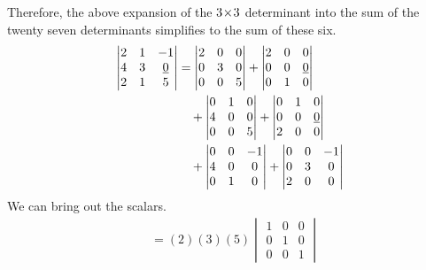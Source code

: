 \begin{example}
Therefore, the above expansion of the \( 3 \! \times \! 3 \) determinant into
the sum of the twenty seven determinants simplifies to the sum of these six.
\begin{align*}
  \begin{vmatrix}
     2  &1  &-1  \\
     4  &3  &\underline{0}  \\
     2  &1  &5
  \end{vmatrix}
  &=\begin{vmatrix}
     2  &0  &0   \\
     0  &3  &0   \\
     0  &0  &5
  \end{vmatrix}
  +
   \begin{vmatrix}
     2  &0  &0   \\
     0  &0  &\underline{0}   \\
     0  &1  &0
  \end{vmatrix}                      \\
  &\quad\hbox{}+\begin{vmatrix}
     0  &1  &0   \\
     4  &0  &0   \\
     0  &0  &5
  \end{vmatrix}
  +
   \begin{vmatrix}
     0  &1  &0   \\
     0  &0  &\underline{0}   \\
     2  &0  &0
  \end{vmatrix}                      \\
  &\quad\hbox{}+\begin{vmatrix}
     0  &0  &-1  \\
     4  &0  &0   \\
     0  &1  &0
  \end{vmatrix}
  +
   \begin{vmatrix}
     0  &0  &-1  \\
     0  &3  &0    \\
     2  &0  &0
  \end{vmatrix}                      
\end{align*}
We can bring out the scalars.
\begin{align*}
  &=(2)(3)(5)\begin{vmatrix}
               1  &0  &0  \\
               0  &1  &0  \\
               0  &0  &1
            \end{vmatrix}

\end{align*}
\end{example}
